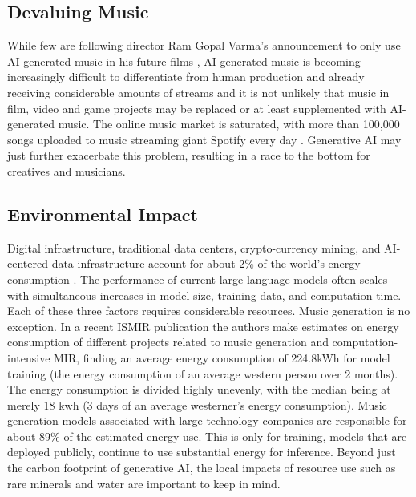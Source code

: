 \subsection{Devaluing Music}
While few are following director Ram Gopal Varma’s announcement to only use AI-generated music in his future films \cite{Singh_2024}, AI-generated music is becoming increasingly difficult to differentiate from human production and already receiving considerable amounts of streams and it is not unlikely that music in film, video and game projects may be replaced or at least supplemented with AI-generated music. The online music market is saturated, with more than 100,000 songs uploaded to music streaming giant Spotify every day \cite{Stassen_2023}. Generative AI may just further exacerbate this problem, resulting in a race to the bottom for creatives and musicians. 

\subsection{Environmental Impact}
Digital infrastructure, traditional data centers, crypto-currency mining, and AI-centered data infrastructure account for about 2\% of the world's energy consumption \cite{Marechal_2024}. The performance of current large language models often scales with simultaneous increases in model size, training data, and computation time.\cite{Kaplan_McCandlish_Henighan_Brown_Chess_Child_Gray_Radford_Wu_Amodei_2020}  Each of these three factors requires considerable resources. Music generation is no exception. In a recent ISMIR publication \cite{Holzapfel_Kaila_Jääskeläinen_2024} the authors make estimates on energy consumption of different projects related to music generation and computation-intensive MIR, finding an average energy consumption of 224.8kWh for model training (the energy consumption of an average western person over 2 months). The energy consumption is divided highly unevenly, with the median being at merely 18 kwh (3 days of an average westerner's energy consumption). Music generation models associated with large technology companies are responsible for about 89\% of the estimated energy use. This is only for training, models that are deployed publicly, continue to use substantial energy for inference. Beyond just the carbon footprint of generative AI, the local impacts of resource use such as rare minerals and water are important to keep in mind. 


